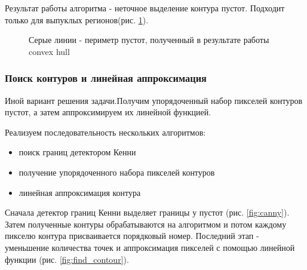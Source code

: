 \documentclass[a4paper, 14pt]{article}
\begin{document}
Результат работы алгоритма - неточное выделение контура пустот. Подходит только для выпуклых регионов(рис. \ref{fig:convex_hull_done}).  
\begin{figure}[h]
	\caption{Серые линии - периметр пустот, полученный в результате работы convex hull}
	\label{fig:convex_hull_done}
\end{figure}

\subsubsection{Поиск контуров и линейная аппроксимация}
\label{final}
Иной вариант решения задачи.Получим упорядоченный набор пикселей контуров пустот, а затем аппроксимируем их линейной функцией. 

Реализуем последовательность нескольких алгоритмов:
\begin{itemize}
	\item поиск границ детектором Кенни \cite{canny}
	
	\item получение упорядоченного набора пикселей контуров \cite{find_contour}
	
	\item линейная аппроксимация контура \cite{polygon_appx}
\end{itemize}
Сначала детектор границ Кенни выделяет границы у пустот (рис. \ref{fig:canny}). Затем полученные контуры обрабатываются на алгоритмом \cite{find_contour} и потом каждому пикселю контура присваивается порядковый номер. Последний этап - уменьшение количества точек и аппроксимация пикселей с помощью линейной функции (рис. \ref{fig:find_contour}).
\end{document}
